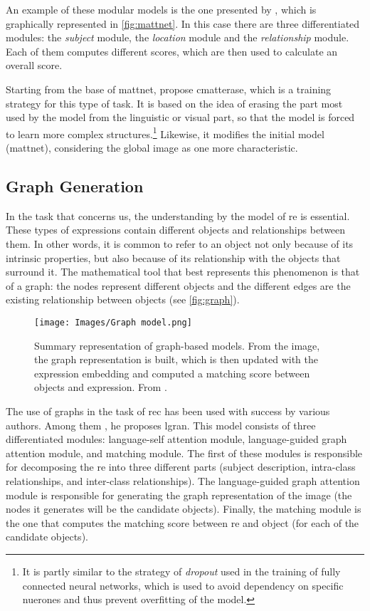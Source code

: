 An example of these modular models is the one presented by ,
which is graphically represented in \vref{fig:mattnet}. In this case there are
three differentiated modules: the \emph{subject} module, the \emph{location}
module and the \emph{relationship} module. Each of them computes different
scores, which are then used to calculate an overall score.

Starting from the base of \gls{mattnet},
 propose
\gls{cmatterase}, which is a training strategy for this type of task. It is
based on the idea of erasing the part most used by the model from the
linguistic or visual part, so that the model is forced to learn more complex
structures.\footnote{It is partly similar to the strategy of \emph{dropout}
  used in the training of fully connected neural networks, which is used to
  avoid dependency on specific nuerones and thus prevent overfitting of the
  model.} Likewise, it modifies the initial model (\gls{mattnet}), considering
the global image as one more characteristic.


\subsection{Graph Generation}\label{sec:graph}
In the task that concerns us, the understanding by the model of \gls{re} is
essential. These types of expressions contain different objects and
relationships between them. In other words, it is common to refer to an object
not only because of its intrinsic properties, but also because of its
relationship with the objects that surround it. The mathematical tool that best
represents this phenomenon is that of a graph: the nodes represent different
objects and the different edges are the existing relationship between objects
(see \vref{fig:graph}).

\begin{figure}[ht]
  \centering
  \texttt{[image: Images/Graph model.png]}
  \caption[Graph based model representation]{Summary representation of
    graph-based models. From the image, the graph representation is built,
    which is then updated with the expression embedding and computed a matching
    score between objects and
    expression. From .}\label{fig:graph}
\end{figure}

The use of graphs in the task of \gls{rec} has been used with success by
various authors. Among them , he proposes
\gls{lgran}. This model consists of three differentiated modules: language-self
attention module, language-guided graph attention module, and matching
module. The first of these modules is responsible for decomposing the \gls{re}
into three different parts (subject description, intra-class relationships, and
inter-class relationships). The language-guided graph attention module is
responsible for generating the graph representation of the image (the nodes it
generates will be the candidate objects). Finally, the matching module is the
one that computes the matching score between \gls{re} and object (for each of
the candidate objects).

